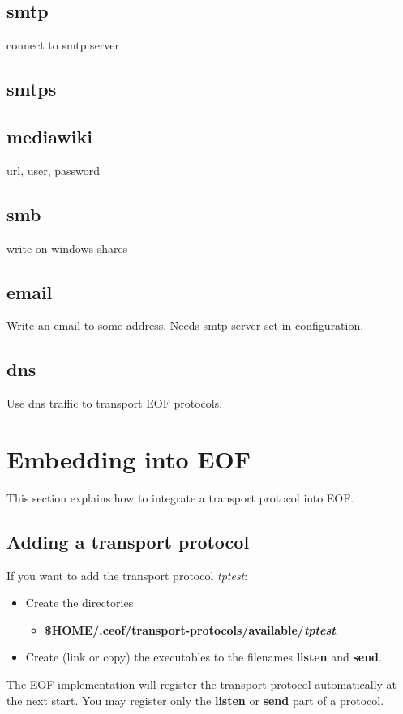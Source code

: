 \documentclass[12pt,a4paper]{book}
\begin{document}
\subsection{smtp}
connect to smtp server
\subsection{smtps}
\subsection{mediawiki}
url, user, password
\subsection{smb}
write on windows shares
\subsection{email}
Write an email to some address. Needs smtp-server set in configuration.
\subsection{dns}
Use dns traffic to transport EOF protocols.

\section{Embedding into EOF}
This section explains how to integrate a transport protocol into EOF.
\subsection{Adding a transport protocol}
If you want to add the transport protocol \emph{tptest}:
\begin{itemize}
\item Create the directories
\begin{itemize}
\item \textbf{\$HOME/.ceof/transport-protocols/available/\emph{tptest}}.
\end{itemize}
\item Create (link or copy) the executables to the filenames \textbf{listen}
and \textbf{send}.
\end{itemize}
The EOF implementation will register the transport protocol automatically
at the next start. You may register only the \textbf{listen} or
\textbf{send} part of a protocol.
\end{document}
